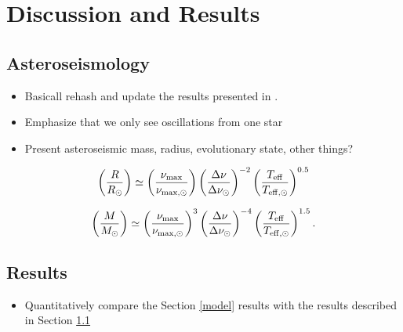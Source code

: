 \section{Discussion and Results}\label{discuss}

\subsection{Asteroseismology}\label{seismo}
\begin{itemize}
\item Basicall rehash and update the results presented in \citet{gau14}.
\item Emphasize that we only see oscillations from one star
\item Present asteroseismic mass, radius, evolutionary state, other things?
\end{itemize}

\begin{equation}
\left( \frac{R}{R_\odot} \right) \simeq \left( \frac{\nu_{\rm{max}}}{\nu_{\rm{max,\odot}}} \right) \left( \frac{\Delta \nu}{\Delta \nu_\odot} \right)^{-2} \left( \frac{T_{\rm{eff}}}{T_{\rm{eff,\odot}}} \right)^{0.5}
\end{equation}

\begin{equation}
\left( \frac{M}{M_\odot} \right) \simeq \left( \frac{\nu_{\rm{max}}}{\nu_{\rm{max,\odot}}} \right)^3 \left( \frac{\Delta \nu}{\Delta \nu_\odot} \right)^{-4} \left( \frac{T_{\rm{eff}}}{T_{\rm{eff,\odot}}} \right)^{1.5}.
\end{equation}


%

\subsection{Results}\label{results}
\begin{itemize}
\item Quantitatively compare the Section \ref{model} results with the \citet{gau14} results described in Section \ref{seismo}
\end{itemize}

%
